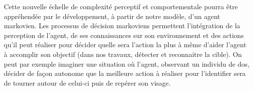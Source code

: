 Cette nouvelle échelle de complexité perceptif et comportementale pourra être appréhendée par le développement, à partir de notre modèle, d'un agent markovien.
Les processus de décision markoviens permettent l'intégration de la perception de l'agent, de ses connaissances sur son environnement et des actions qu'il peut réaliser pour décider quelle sera l'action la plus à même d'aider l'agent à accomplir son objectif (dans nos travaux, détecter et reconnaitre la cible).
On peut par exemple imaginer une situation où l'agent, observant un individu de dos, décider de façon autonome que la meilleure action à réaliser pour l'identifier sera de tourner autour de celui-ci puis de repérer son visage. \autocite{Butko2010, Najemnik2005, Zhaoping2014} \\